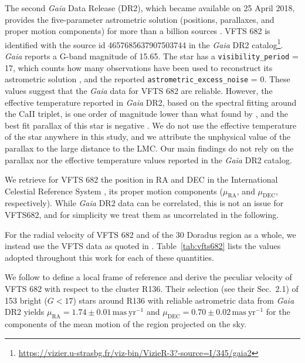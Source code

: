 \documentclass[apjl,twocolumn]{emulateapj}
\DeclareRobustCommand{\Tabref}[1]{Table~\ref{#1}}
\begin{document}
The second \emph{Gaia} Data Release (DR2), which became available on 25 April 2018,
provides the five-parameter astrometric solution (positions,
parallaxes, and proper motion components) for more than a billion
sources \citep{brown:18}. VFTS 682 is identified with the source id 4657685637907503744 in the \emph{Gaia} DR2
catalog\footnote{\url{https://vizier.u-strasbg.fr/viz-bin/VizieR-3?-source=I/345/gaia2}}. \emph{Gaia}
reports a G-band magnitude of 15.65. The star has a
\texttt{visibility\_period} = 17, which counts how many observations have
been used to reconstruct its astrometric solution
\citep[][]{lindengren:18}, and the reported
\texttt{astrometric\_excess\_noise} = 0. These values suggest that the \emph{Gaia}
data for VFTS 682 are reliable. However, the effective temperature
reported in \emph{Gaia} DR2, based on the spectral fitting around the
CaII triplet, is one order of magnitude lower than what found by
\cite{bestenlehner:11}, and the best fit parallax of this star is
negative \citep[see, e.g.,][]{hogg:18}. We do not use the effective temperature of the star anywhere
in this study, and we attribute the unphysical value of the parallax
to the large distance to the LMC. Our main findings do not rely on the
parallax nor the effective temperature values reported in the \emph{Gaia} DR2
catalog.

We retrieve for VFTS 682 the position in RA and DEC
in the International Celestial Reference System \cite[][]{brown:18}, its
proper motion components ($\mu_\mathrm{RA}$, and $\mu_\mathrm{DEC}$,
respectively). While \emph{Gaia} DR2 data can be correlated, this is
not an issue for VFTS682, and for simplicity we treat them as
uncorrelated in the following.

For the radial velocity of VFTS 682 and of the 30 Doradus
region as a whole, we instead use the VFTS data
as quoted in \cite{bestenlehner:11}. \Tabref{tab:vfts682} lists the values adopted throughout
this work for each of these quantities.

We follow \citet{lennon:18} to define a local frame of reference and derive the peculiar velocity
of VFTS 682 with respect to the cluster R136. Their selection (see
their Sec.~2.1) of 153
bright ($G<17$) stars around R136 with reliable astrometric data from
\emph{Gaia} DR2 yields $\mu_\mathrm{RA}=1.74\pm0.01\,\mathrm{mas\
  yr^{-1}}$ and $\mu_\mathrm{DEC}=0.70\pm0.02\,\mathrm{mas\ yr^{-1}}$
for the components of the mean motion of the region projected on the sky.
\end{document}
